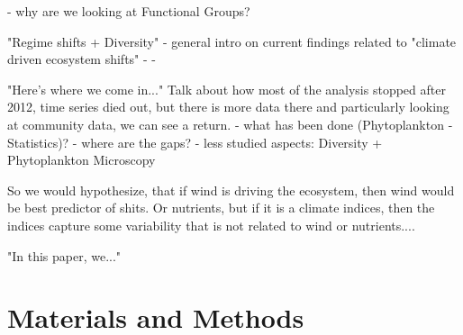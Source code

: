 \documentclass[draft]{agujournal2019}
\begin{document}
    - why are we looking at Functional Groups?
    
    "Regime shifts + Diversity" - general intro on current findings related to "climate driven ecosystem shifts"
        - %
        - 

        "Here's where we come in..." Talk about how most of the analysis stopped after 2012, time series died out, but there is more data there and particularly looking at community data, we can see a return.
    - what has been done (Phytoplankton - Statistics)?
    - where are the gaps?
    - less studied aspects: Diversity + Phytoplankton Microscopy

    So we would hypothesize, that if wind is driving the ecosystem, then wind would be best predictor of shits.
    Or nutrients, but if it is a climate indices, then the indices capture some variability that is not related to wind or nutrients....
        
    
    "In this paper, we..." 





\section{Materials and Methods}
%
\end{document}
